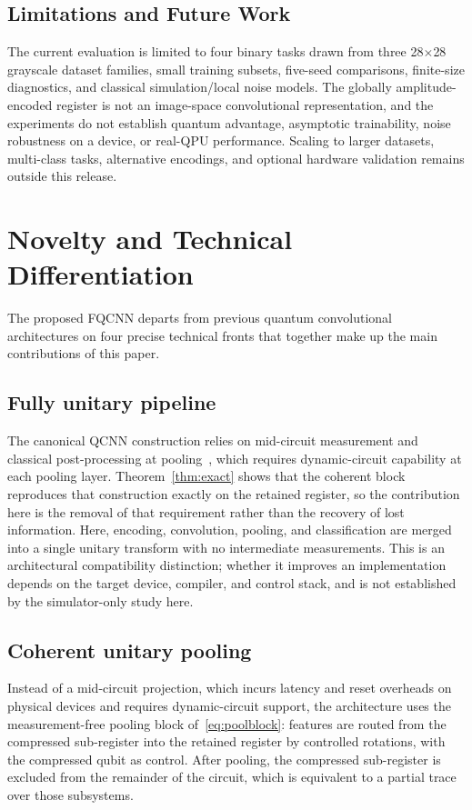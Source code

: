 \documentclass[conference]{IEEEtran}
\begin{document}
\subsection{Limitations and Future Work}
The current evaluation is limited to four binary tasks drawn from three 28$\times$28 grayscale dataset families, small training subsets, five-seed comparisons, finite-size diagnostics, and classical simulation/local noise models. The globally amplitude-encoded register is not an image-space convolutional representation, and the experiments do not establish quantum advantage, asymptotic trainability, noise robustness on a device, or real-QPU performance. Scaling to larger datasets, multi-class tasks, alternative encodings, and optional hardware validation remains outside this release.

\section{Novelty and Technical Differentiation}
The proposed FQCNN departs from previous quantum convolutional architectures on four precise technical fronts that together make up the main contributions of this paper.

\subsection{Fully unitary pipeline}
The canonical QCNN construction relies on mid-circuit measurement and classical post-processing at pooling~\cite{ref37}, which requires dynamic-circuit capability at each pooling layer. Theorem~\ref{thm:exact} shows that the coherent block reproduces that construction exactly on the retained register, so the contribution here is the removal of that requirement rather than the recovery of lost information. Here, encoding, convolution, pooling, and classification are merged into a single unitary transform with no intermediate measurements. This is an architectural compatibility distinction; whether it improves an implementation depends on the target device, compiler, and control stack, and is not established by the simulator-only study here.

\subsection{Coherent unitary pooling}
Instead of a mid-circuit projection, which incurs latency and reset overheads on physical devices and requires dynamic-circuit support, the architecture uses the measurement-free pooling block of~\eqref{eq:poolblock}: features are routed from the compressed sub-register into the retained register by controlled rotations, with the compressed qubit as control. After pooling, the compressed sub-register is excluded from the remainder of the circuit, which is equivalent to a partial trace over those subsystems.
\end{document}
